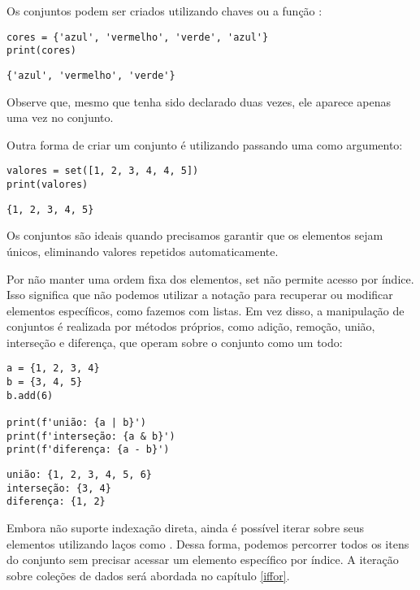 Os conjuntos podem ser criados utilizando chaves \inlcode{\{\}} ou a função :
\begin{verbatim}
cores = {'azul', 'vermelho', 'verde', 'azul'}
print(cores)
\end{verbatim}
\begin{verbatim}
{'azul', 'vermelho', 'verde'}
\end{verbatim}

Observe que, mesmo que  tenha sido declarado duas vezes, ele aparece apenas uma vez no conjunto.

Outra forma de criar um conjunto é utilizando  passando uma  como argumento:
\begin{verbatim}
valores = set([1, 2, 3, 4, 4, 5])
print(valores)
\end{verbatim}
\begin{verbatim}
{1, 2, 3, 4, 5}
\end{verbatim}

Os conjuntos são ideais quando precisamos garantir que os elementos sejam únicos, eliminando valores repetidos automaticamente.

Por não manter uma ordem fixa dos elementos, set não permite acesso por índice.
Isso significa que não podemos utilizar a notação  para recuperar ou modificar elementos
específicos, como fazemos com listas.
Em vez disso, a manipulação de conjuntos é realizada por métodos próprios, como adição, remoção, união, interseção e
diferença, que operam sobre o conjunto como um todo:

\begin{verbatim}
a = {1, 2, 3, 4}
b = {3, 4, 5}
b.add(6)

print(f'união: {a | b}')
print(f'interseção: {a & b}')
print(f'diferença: {a - b}')
\end{verbatim}
\begin{verbatim}
união: {1, 2, 3, 4, 5, 6}
interseção: {3, 4}
diferença: {1, 2}
\end{verbatim}

Embora  não suporte indexação direta, ainda é possível iterar sobre seus elementos utilizando laços
como .
Dessa forma, podemos percorrer todos os itens do conjunto sem precisar acessar um elemento
específico por índice.
A iteração sobre coleções de dados será abordada no capítulo \ref{iffor}.

